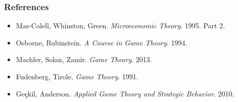 \documentclass[10pt]{beamer}
\theoremstyle{definition}
\begin{document}
\begin{frame}[fragile]
\frametitle{References}
\begin{itemize}\itemsep1em
	\item Mas-Colell, Whinston, Green. \emph{Microeconomic Theory}. 1995. Part 2.
	\item Osborne, Rubinstein. \emph{A Course in Game Theory}. 1994.
	\item Machler, Solan, Zamir. \emph{Game Theory}. 2013.
	\item Fudenberg, Tirole. \emph{Game Theory}. 1991.
	\item Ge\c ckil, Anderson. \emph{Applied Game Theory and Strategic Behavior}. 2010.
\end{itemize}
\end{frame}
\end{document}
